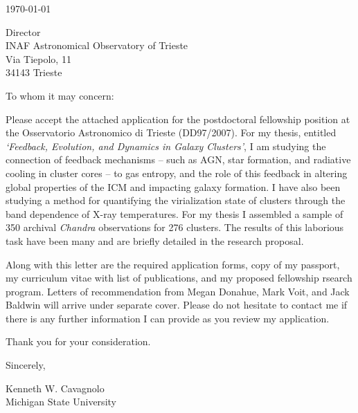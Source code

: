 \documentclass[11pt]{article}
\begin{document}
\today

Director\\
INAF Astronomical Observatory of Trieste\\
Via Tiepolo, 11\\
34143 Trieste

To whom it may concern:

Please accept the attached application for the postdoctoral
fellowship position at the Osservatorio Astronomico di Trieste
(DD97/2007). For my thesis, entitled {\textit{`Feedback,
Evolution, and Dynamics in Galaxy Clusters'}}, I am studying
the connection of feedback mechanisms -- such as AGN, star formation, and
radiative cooling in cluster cores -- to gas entropy, and the role
of this feedback in altering global properties of the ICM and 
impacting galaxy formation. I have also been studying a method for
quantifying the virialization state of clusters through the band
dependence of X-ray temperatures. For my thesis I assembled a sample
of 350 archival {\textit{Chandra}} observations for 276 clusters. The
results of this laborious task have been many and are briefly detailed
in the research proposal.

Along with this letter are the required application forms, copy of my
passport, my curriculum vitae with list of publications, and my
proposed fellowship rsearch program. Letters of recommendation from
Megan Donahue, Mark Voit, and Jack Baldwin will arrive under separate
cover. Please do not hesitate to contact me if there is any further
information I can provide as you review my application.

Thank you for your consideration.

Sincerely,\\
\begin{minipage}{7.5in}
\end{minipage}
Kenneth W. Cavagnolo\\
Michigan State University
\end{document}
